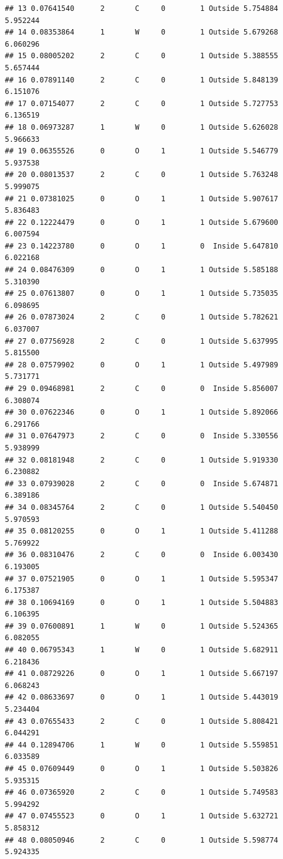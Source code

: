 \documentclass[]{article}
\begin{document}
\begin{verbatim}
## 13 0.07641540      2       C     0        1 Outside 5.754884 5.952244
## 14 0.08353864      1       W     0        1 Outside 5.679268 6.060296
## 15 0.08005202      2       C     0        1 Outside 5.388555 5.657444
## 16 0.07891140      2       C     0        1 Outside 5.848139 6.151076
## 17 0.07154077      2       C     0        1 Outside 5.727753 6.136519
## 18 0.06973287      1       W     0        1 Outside 5.626028 5.966633
## 19 0.06355526      0       O     1        1 Outside 5.546779 5.937538
## 20 0.08013537      2       C     0        1 Outside 5.763248 5.999075
## 21 0.07381025      0       O     1        1 Outside 5.907617 5.836483
## 22 0.12224479      0       O     1        1 Outside 5.679600 6.007594
## 23 0.14223780      0       O     1        0  Inside 5.647810 6.022168
## 24 0.08476309      0       O     1        1 Outside 5.585188 5.310390
## 25 0.07613807      0       O     1        1 Outside 5.735035 6.098695
## 26 0.07873024      2       C     0        1 Outside 5.782621 6.037007
## 27 0.07756928      2       C     0        1 Outside 5.637995 5.815500
## 28 0.07579902      0       O     1        1 Outside 5.497989 5.731771
## 29 0.09468981      2       C     0        0  Inside 5.856007 6.308074
## 30 0.07622346      0       O     1        1 Outside 5.892066 6.291766
## 31 0.07647973      2       C     0        0  Inside 5.330556 5.938999
## 32 0.08181948      2       C     0        1 Outside 5.919330 6.230882
## 33 0.07939028      2       C     0        0  Inside 5.674871 6.389186
## 34 0.08345764      2       C     0        1 Outside 5.540450 5.970593
## 35 0.08120255      0       O     1        1 Outside 5.411288 5.769922
## 36 0.08310476      2       C     0        0  Inside 6.003430 6.193005
## 37 0.07521905      0       O     1        1 Outside 5.595347 6.175387
## 38 0.10694169      0       O     1        1 Outside 5.504883 6.106395
## 39 0.07600891      1       W     0        1 Outside 5.524365 6.082055
## 40 0.06795343      1       W     0        1 Outside 5.682911 6.218436
## 41 0.08729226      0       O     1        1 Outside 5.667197 6.068243
## 42 0.08633697      0       O     1        1 Outside 5.443019 5.234404
## 43 0.07655433      2       C     0        1 Outside 5.808421 6.044291
## 44 0.12894706      1       W     0        1 Outside 5.559851 6.033589
## 45 0.07609449      0       O     1        1 Outside 5.503826 5.935315
## 46 0.07365920      2       C     0        1 Outside 5.749583 5.994292
## 47 0.07455523      0       O     1        1 Outside 5.632721 5.858312
## 48 0.08050946      2       C     0        1 Outside 5.598774 5.924335

\end{verbatim}
\end{document}
